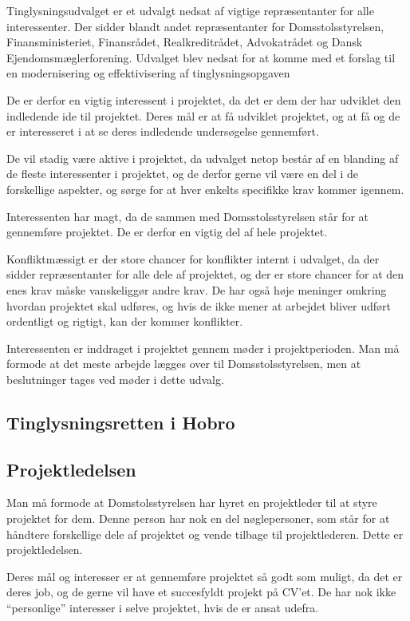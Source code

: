 \documentclass[10pt,a4paper,danish]{article}
\begin{document}
Tinglysningsudvalget er et udvalgt nedsat af vigtige repræsentanter for alle interessenter. Der sidder blandt andet repræsentanter for Domsstolsstyrelsen, Finansministeriet, Finansrådet, Realkreditrådet, Advokatrådet og Dansk Ejendomsmæglerforening. Udvalget blev nedsat for at komme med et forslag til en modernisering og effektivisering af tinglysningsopgaven

De er derfor en vigtig interessent i projektet, da det er dem der har udviklet den indledende ide til projektet. Deres mål er at få udviklet projektet, og at få og de er interesseret i at se deres indledende undersøgelse gennemført.

De vil stadig være aktive i projektet, da udvalget netop består af en blanding af de fleste interessenter i projektet, og de derfor gerne vil være en del i de forskellige aspekter, og sørge for at hver enkelts specifikke krav kommer igennem.

Interessenten har magt, da de sammen med Domsstolsstyrelsen står for at gennemføre projektet. De er derfor en vigtig del af hele projektet.

Konfliktmæssigt er der store chancer for konflikter internt i udvalget, da der sidder repræsentanter for alle dele af projektet, og der er store chancer for at den enes krav måske vanskeliggør andre krav. De har også høje meninger omkring hvordan projektet skal udføres, og hvis de ikke mener at arbejdet bliver udført ordentligt og rigtigt, kan der kommer konflikter.

Interessenten er inddraget i projektet gennem møder i projektperioden. Man må formode at det meste arbejde lægges over til Domsstolsstyrelsen, men at beslutninger tages ved møder i dette udvalg.

\subsection{Tinglysningsretten i Hobro}


\subsection{Projektledelsen}
Man må formode at Domstolsstyrelsen har hyret en projektleder til at styre projektet for dem. Denne person har nok en del nøglepersoner, som står for at håndtere forskellige dele af projektet og vende tilbage til projektlederen. Dette er projektledelsen.

Deres mål og interesser er at gennemføre projektet så godt som muligt, da det er deres job, og de gerne vil have et succesfyldt projekt på CV'et. De har nok ikke "`personlige"' interesser i selve projektet, hvis de er ansat udefra.
\end{document}
